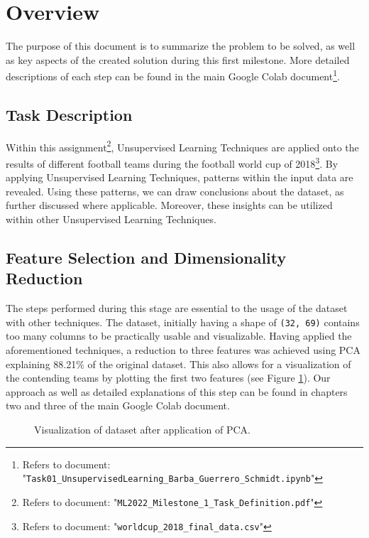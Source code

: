 \section{Overview}
The purpose of this document is to summarize the problem to be solved, as well as key aspects of the created solution during this first milestone. More detailed descriptions of each step can be found in the main Google Colab document\footnote{Refers to document: "\texttt{Task01\_UnsupervisedLearning\_Barba\_Guerrero\_Schmidt.ipynb}"}. 

\subsection{Task Description}
Within this assignment\footnote{Refers to document: "\texttt{ML2022\_Milestone\_1\_Task\_Definition.pdf}"}, Unsupervised Learning Techniques are applied onto the results of different football teams during the football world cup of 2018\footnote{Refers to document: "\texttt{worldcup\_2018\_final\_data.csv}"}. By applying Unsupervised Learning Techniques, patterns within the input data are revealed. Using these patterns, we can draw conclusions about the dataset, as further discussed where applicable. Moreover, these insights can be utilized within other Unsupervised Learning Techniques.

\newpage

\subsection{Feature Selection and Dimensionality Reduction}
The steps performed during this stage are essential to the usage of the dataset with other techniques. The dataset, initially having a shape of \texttt{(32, 69)} contains too many columns to be practically usable and visualizable. Having applied the aforementioned techniques, a reduction to three features was achieved using PCA explaining 88.21\% of the original dataset. This also allows for a visualization of the contending teams by plotting the first two features (see Figure \ref{PICTURE_visualization_PCA}). Our approach as well as detailed explanations of this step can be found in chapters two and three of the main Google Colab document.

\begin{figure}[h!]
	\centering
	\caption{Visualization of dataset after application of PCA.}
	\label{PICTURE_visualization_PCA}
\end{figure}

